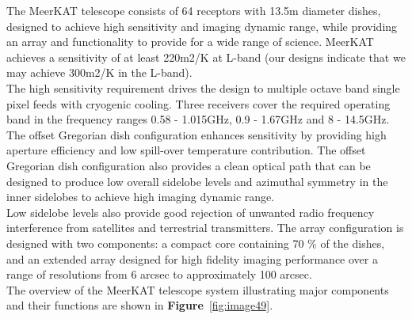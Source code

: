 





The MeerKAT telescope consists of 64 receptors with 13.5\unit{m} diameter dishes, designed to achieve high sensitivity and imaging dynamic range, while providing an array and functionality to provide for a wide range of science. 
MeerKAT achieves a sensitivity of at least 220\unit{m2/K} at L-band (our designs indicate that we may achieve 300\unit{m2/K} in the L-band).\\
The high sensitivity requirement drives the design to multiple octave band single pixel feeds with cryogenic cooling. Three receivers cover the required operating band in the frequency ranges 0.58 - 1.015\unit{GHz}, 0.9 - 1.67\unit{GHz} and 8 - 14.5\unit{GHz}. 
The offset Gregorian dish configuration enhances sensitivity by providing high aperture efficiency and low spill-over temperature contribution. The offset Gregorian dish configuration also provides a clean optical path that can be designed to produce low overall sidelobe levels and azimuthal symmetry in the inner sidelobes to achieve high imaging dynamic range. \\
Low sidelobe levels also provide good rejection of unwanted radio frequency interference from satellites and terrestrial transmitters. The array configuration is designed with two components: a compact core containing 70 \% of the dishes, and an extended array
designed for high fidelity imaging performance over a range of resolutions from 6 arcsec to approximately 100 arcsec. \\
The overview of the MeerKAT telescope system illustrating major components and their functions  are shown in \textbf{Figure}~\ref{fig:image49}.


